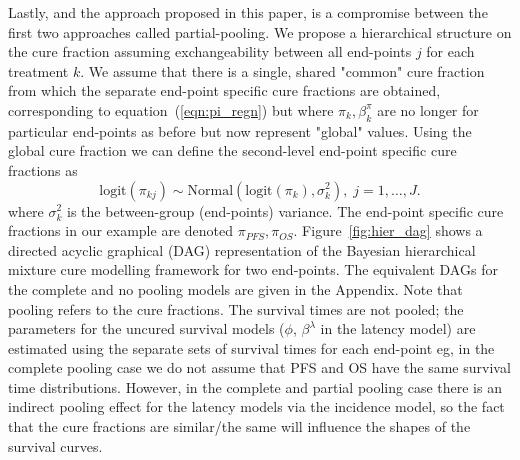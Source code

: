 \documentclass[AMA,STIX1COL]{WileyNJD-v2}
\begin{document}
Lastly, and the approach proposed in this paper, is a compromise between the first two approaches called partial-pooling.
We propose a hierarchical structure on the cure fraction assuming exchangeability between all end-points $j$ for each treatment $k$.
We assume that there is a single, shared "common" cure fraction from which the separate end-point specific cure fractions are obtained, corresponding to equation~(\ref{eqn:pi_regn})
but where $\pi_{k}, \beta^{\pi}_{k}$ are no longer for particular end-points as before but now represent "global" values.
Using the global cure fraction we can define the second-level end-point specific cure fractions as
$$
\text{logit}(\pi_{kj}) \sim \text{Normal}(\text{logit}(\pi_k), \sigma_k^2), \; j = 1, \ldots, J.  
$$
where $\sigma_k^2$ is the between-group (end-points) variance.
The end-point specific cure fractions in our example are denoted $\pi_{PFS}, \pi_{OS}$.
Figure~\ref{fig:hier_dag} shows a directed acyclic graphical (DAG) representation of the Bayesian hierarchical mixture cure modelling framework for two end-points.
The equivalent DAGs for the complete and no pooling models are given in the Appendix.
Note that pooling refers to the cure fractions. The survival times are not pooled; the parameters for the uncured survival models ($\phi$, $\beta^{\lambda}$ in the latency model) are estimated using the separate sets of survival times for each end-point
eg, in the complete pooling case we do not assume that PFS and OS have the same survival time distributions.
However, in the complete and partial pooling case there is an indirect pooling effect for the latency models via the incidence model, so the fact that the cure fractions are similar/the same will influence the shapes of the survival curves.

\end{document}
